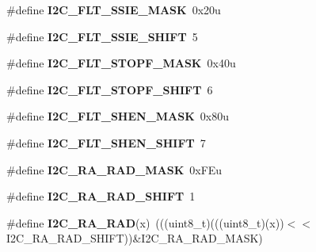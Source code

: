 \begin{DoxyCompactItemize}
\item 
\#define {\bfseries I2\+C\+\_\+\+F\+L\+T\+\_\+\+S\+S\+I\+E\+\_\+\+M\+A\+SK}~0x20u\hypertarget{group__I2C__Register__Masks_ga532d6e283f53b115820f6a20f4f442a8}{}\label{group__I2C__Register__Masks_ga532d6e283f53b115820f6a20f4f442a8}

\item 
\#define {\bfseries I2\+C\+\_\+\+F\+L\+T\+\_\+\+S\+S\+I\+E\+\_\+\+S\+H\+I\+FT}~5\hypertarget{group__I2C__Register__Masks_ga6fa677ac36d808e9e048d3ab81623f8c}{}\label{group__I2C__Register__Masks_ga6fa677ac36d808e9e048d3ab81623f8c}

\item 
\#define {\bfseries I2\+C\+\_\+\+F\+L\+T\+\_\+\+S\+T\+O\+P\+F\+\_\+\+M\+A\+SK}~0x40u\hypertarget{group__I2C__Register__Masks_ga49bb44800a0defc2dd1efb27263f7c52}{}\label{group__I2C__Register__Masks_ga49bb44800a0defc2dd1efb27263f7c52}

\item 
\#define {\bfseries I2\+C\+\_\+\+F\+L\+T\+\_\+\+S\+T\+O\+P\+F\+\_\+\+S\+H\+I\+FT}~6\hypertarget{group__I2C__Register__Masks_gae69dbb7d8bd1dff50e5c30846d3285bb}{}\label{group__I2C__Register__Masks_gae69dbb7d8bd1dff50e5c30846d3285bb}

\item 
\#define {\bfseries I2\+C\+\_\+\+F\+L\+T\+\_\+\+S\+H\+E\+N\+\_\+\+M\+A\+SK}~0x80u\hypertarget{group__I2C__Register__Masks_gac404fda03fc23c08a56018d6ab2fc977}{}\label{group__I2C__Register__Masks_gac404fda03fc23c08a56018d6ab2fc977}

\item 
\#define {\bfseries I2\+C\+\_\+\+F\+L\+T\+\_\+\+S\+H\+E\+N\+\_\+\+S\+H\+I\+FT}~7\hypertarget{group__I2C__Register__Masks_ga5d6c7b67f99e1f592d199bb77f7d5605}{}\label{group__I2C__Register__Masks_ga5d6c7b67f99e1f592d199bb77f7d5605}

\item 
\#define {\bfseries I2\+C\+\_\+\+R\+A\+\_\+\+R\+A\+D\+\_\+\+M\+A\+SK}~0x\+F\+Eu\hypertarget{group__I2C__Register__Masks_gaa39c37c0d41e4cdafc00884a2fc791fa}{}\label{group__I2C__Register__Masks_gaa39c37c0d41e4cdafc00884a2fc791fa}

\item 
\#define {\bfseries I2\+C\+\_\+\+R\+A\+\_\+\+R\+A\+D\+\_\+\+S\+H\+I\+FT}~1\hypertarget{group__I2C__Register__Masks_ga8571ae2c33f4ea6503f568c2151ef2a9}{}\label{group__I2C__Register__Masks_ga8571ae2c33f4ea6503f568c2151ef2a9}

\item 
\#define {\bfseries I2\+C\+\_\+\+R\+A\+\_\+\+R\+AD}(x)~(((uint8\+\_\+t)(((uint8\+\_\+t)(x))$<$$<$I2\+C\+\_\+\+R\+A\+\_\+\+R\+A\+D\+\_\+\+S\+H\+I\+FT))\&I2\+C\+\_\+\+R\+A\+\_\+\+R\+A\+D\+\_\+\+M\+A\+SK)\hypertarget{group__I2C__Register__Masks_gae2a3d76c69fe5e8947660274f6744031}{}\label{group__I2C__Register__Masks_gae2a3d76c69fe5e8947660274f6744031}


\end{DoxyCompactItemize}
